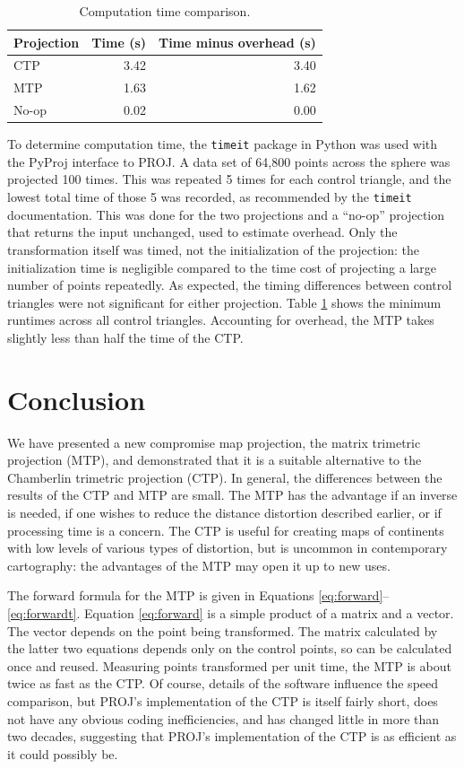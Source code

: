\documentclass[]{interact}
\begin{document}
\begin{table}
\begin{tabular}{ l r r}
  Projection & Time (s) & Time minus overhead (s)\\
\hline
  CTP & 3.42 & 3.40 \\
  MTP & 1.63 & 1.62 \\
  No-op & 0.02 & 0.00
\end{tabular}
\caption{Computation time comparison.}
\label{table:time}
\end{table}

To determine computation time, the \texttt{timeit} package in Python
\citep{python} was used with the PyProj interface to PROJ. \citep{pyproj} A
data set of 64,800 points across the sphere was projected 100 times. This was
repeated 5 times for each control triangle, and the lowest total time of those 5
was recorded, as recommended by the \texttt{timeit} documentation. This was
done for the two projections and a ``no-op'' projection that returns the input
unchanged, used to estimate overhead. Only the transformation itself was timed,
not the initialization of the projection: the initialization time is negligible
compared to the time cost of projecting a large number of points repeatedly. As
expected, the timing differences between control triangles were not significant
for either projection. Table \ref{table:time} shows the minimum
runtimes across all control triangles. Accounting for overhead,
the MTP takes slightly less than half the time of the CTP.

\section{Conclusion}
We have presented a new compromise map projection, the matrix trimetric
projection (MTP), and demonstrated that it is a suitable alternative to the
Chamberlin trimetric projection (CTP). In general, the differences between the
results of the CTP and MTP are small. The MTP has the advantage if an inverse
is needed, if one wishes to reduce the distance distortion described earlier,
or if processing time is a concern. The CTP is useful for creating maps of
continents with low levels of various types of distortion,
but is uncommon in contemporary cartography:
the advantages of the MTP may open it up to new uses.

The forward formula for the MTP is given in Equations
\ref{eq:forward}--\ref{eq:forwardt}. Equation \ref{eq:forward} is a simple
product of a matrix and a vector. The vector depends on the point being
transformed. The matrix calculated by the latter two equations depends only on
the control points, so can be calculated once and reused. Measuring points
transformed per unit time, the MTP is about twice as fast as the CTP. Of course,
details of the software influence the speed comparison, but PROJ's
implementation of the CTP is itself fairly short, does not have any obvious
coding inefficiencies,
and has changed little in more than two decades, suggesting that
PROJ's implementation of the CTP is as efficient as it could possibly be.
\end{document}
